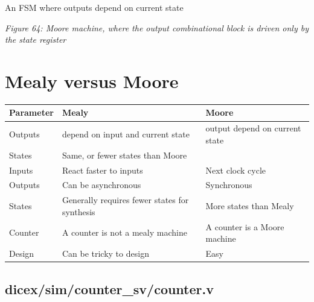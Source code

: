 An FSM where outputs depend on current state


{
\centering
{}
}

\emph{Figure 64: Moore machine, where the output combinational block is
driven only by the state register}

\section{Mealy versus Moore}\label{mealy-versus-moore}

\begin{longtable}[]{@{}
  >{\centering\arraybackslash}p{}
  >{\centering\arraybackslash}p{}
  >{\centering\arraybackslash}p{}@{}}
\toprule\noalign{}
\begin{minipage}[b]{\linewidth}\centering
Parameter
\end{minipage} & \begin{minipage}[b]{\linewidth}\centering
Mealy
\end{minipage} & \begin{minipage}[b]{\linewidth}\centering
Moore
\end{minipage} \\
\midrule\noalign{}
\endhead
\bottomrule\noalign{}
\endlastfoot
Outputs & depend on input and current state & output depend on current
state \\
States & Same, or fewer states than Moore & \\
Inputs & React faster to inputs & Next clock cycle \\
Outputs & Can be asynchronous & Synchronous \\
States & Generally requires fewer states for synthesis & More states
than Mealy \\
Counter & A counter is not a mealy machine & A counter is a Moore
machine \\
Design & Can be tricky to design & Easy \\
\end{longtable}

\subsection{dicex/sim/counter\_sv/counter.v}\label{dicexsimcounter_svcounter.v}

